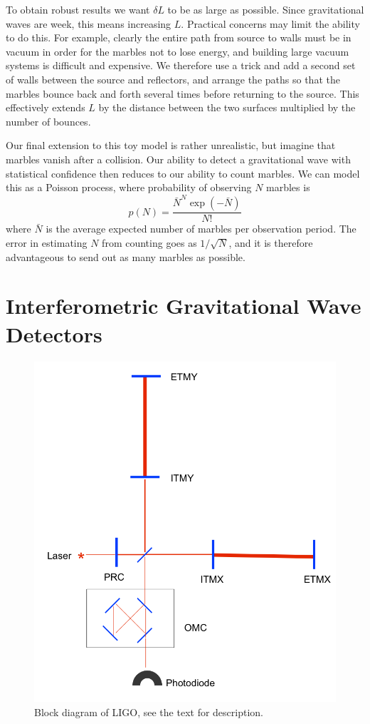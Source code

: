 To obtain robust results we want $\delta L$ to be as large as
possible.  Since gravitational waves are week, this means increasing
$L$.  Practical concerns may limit the ability to do this.  For
example, clearly the entire path from source to walls must be in
vacuum in order for the marbles not to lose energy, and building large
vacuum systems is difficult and expensive.  We therefore use a trick
and add a second set of walls between the source and reflectors, and
arrange the paths so that the marbles bounce back and forth several
times before returning to the source.  This effectively extends $L$ by
the distance between the two surfaces multiplied by the number of
bounces.

Our final extension to this toy model is rather unrealistic, but
imagine that marbles vanish after a collision.  Our ability to detect a
gravitational wave with statistical confidence then reduces to our
ability to count marbles.  We can model this as a Poisson process, where
probability of observing $N$ marbles is 
%
\begin{equation*}
p(N) = \frac{\bar{N}^N \exp(-\bar{N})} {N!}
\end{equation*}
%
where $\bar{N}$ is the average expected number of marbles per
observation period.  The error in estimating $N$ from counting goes as
$1/\sqrt{N}$, and it is therefore advantageous to send out as many 
marbles as possible.

\section{Interferometric Gravitational Wave Detectors}

\begin{figure}
  \includegraphics[width=\linewidth]{figures/detectors/LIGO}
  \caption[Block diagram of LIGO]{
  \label{f:ligo}
Block diagram of LIGO, see the text for description.
}
\end{figure}%

